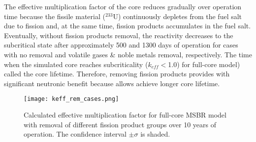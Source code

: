The effective multiplication factor of the core reduces gradually over operation time because the fissile material ($^{233}$U) continuously depletes from the fuel salt due to fission and, at the same time, fission products accumulates in the fuel salt.	Eventually, without fission products removal, the reactivity decreases to the subcritical state after approximately 500 and 1300 days of operation for cases with no removal and volatile gases \& noble metals removal, respectively. The time when the simulated core reaches subcriticality ($k_{eff}<$1.0) for full-core model) called the core lifetime. Therefore, removing fission products provides with significant neutronic benefit because allows achieve longer core lifetime.
\begin{figure}[ht!] %
  \centering
  \texttt{[image: keff\_rem\_cases.png]} 
  \caption{Calculated effective multiplication factor for full-core \gls{MSBR} model with removal of different fission product groups over 10 years of operation. The confidence interval $\pm\sigma	$ is shaded.}
  \label{fig:fp_removal}
\end{figure}